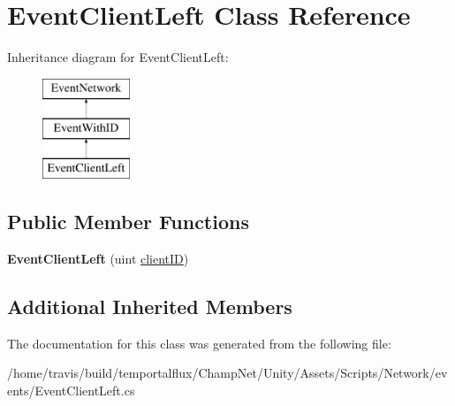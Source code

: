 \hypertarget{class_event_client_left}{\section{Event\-Client\-Left Class Reference}
\label{class_event_client_left}
}
Inheritance diagram for Event\-Client\-Left\-:\begin{figure}[H]
\begin{center}
\leavevmode
\includegraphics[height=3.000000cm]{class_event_client_left}
\end{center}
\end{figure}
\subsection*{Public Member Functions}
\begin{DoxyCompactItemize}
\item 
\hypertarget{class_event_client_left_a8e4abe7260a23d9993581f831c56ac06}{{\bfseries Event\-Client\-Left} (uint \hyperlink{class_event_with_i_d_a4b58cdaef622cb06405b6829a160cef5}{client\-I\-D})}\label{class_event_client_left_a8e4abe7260a23d9993581f831c56ac06}

\end{DoxyCompactItemize}
\subsection*{Additional Inherited Members}


The documentation for this class was generated from the following file\-:\begin{DoxyCompactItemize}
\item 
/home/travis/build/temportalflux/\-Champ\-Net/\-Unity/\-Assets/\-Scripts/\-Network/events/Event\-Client\-Left.\-cs\end{DoxyCompactItemize}
